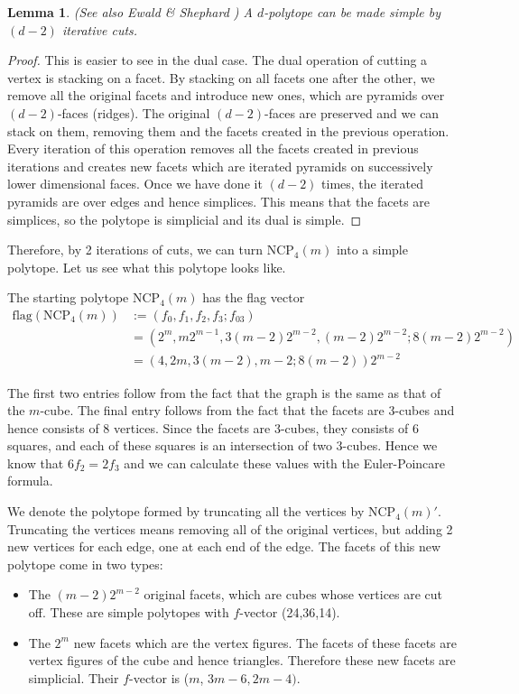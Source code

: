 \documentclass[a4paper,12pt]{book}
\theoremstyle{plain}
\newtheorem{lemma}[theorem]{Lemma}
\theoremstyle{definition}
\newcommand\NC{\textrm{NCP}}
\begin{document}
 

\begin{lemma}
(See also Ewald \& Shephard \cite{EwSh}) A $d$-polytope can be made simple 
by $(d-2)$ iterative cuts.
\end{lemma}

\begin{proof}
This is easier to see in the dual case. The dual operation of cutting a vertex 
is stacking on a facet. By stacking on all facets one after the other, we 
remove all the original facets and introduce new ones, which are pyramids over 
$(d-2)$-faces (ridges). The original $(d-2)$-faces are preserved and we can stack on 
them, removing them and the facets created in the previous operation. Every 
iteration of this operation removes all the facets created in previous 
iterations and creates new facets which are iterated pyramids on successively 
lower dimensional faces. Once we have done it $(d-2)$ times, the iterated 
pyramids are over edges and hence simplices. This means that the facets are 
simplices, so the polytope is simplicial and its dual is simple.
\end{proof}

Therefore, by 2 iterations of cuts, we can turn $\NC_4(m)$ into a simple 
polytope. Let us see what this polytope looks like. 

The starting polytope $\NC_4(m)$ has the flag vector 
\begin{align*}
 \textrm{flag}(\NC_4(m)) &:= (f_0, f_1, f_2, f_3; f_{03}) \\
	&= (2^m, m2^{m-1}, 3(m-2)2^{m-2}, (m-2)2^{m-2}; 8(m-2)2^{m-2}) \\
	&= (4, 2m, 3(m-2), m-2; 8(m-2))2^{m-2}
\end{align*}

The first two entries follow from the fact that the graph is the same as that 
of the $m$-cube. The final entry follows from the fact that the facets are 
3-cubes and hence consists of 8 vertices. Since the facets are 3-cubes, they 
consists of 6 squares, and each of these squares is an intersection of two 
3-cubes. Hence we know that $6f_2 = 2f_3$ and we can calculate these values with 
the Euler-Poincare formula.

We denote the polytope formed by truncating all the vertices by $\NC_4(m)'$.
Truncating the vertices means removing all of the original vertices, but 
adding 2 new vertices for each edge, one at each end of the edge. The facets of this new 
polytope come in two types:

\begin{itemize}
 \item The $(m-2)2^{m-2}$ original facets, which are cubes whose vertices are 
cut off. These are simple polytopes with $f$-vector (24,36,14).
 \item The $2^m$ new facets which are the vertex figures. The facets of these 
facets are vertex figures of the cube and hence triangles. Therefore these 
new facets are simplicial. Their $f$-vector is ($m$, 
$3m-6, 2m-4)$.
\end{itemize}
\end{document}
